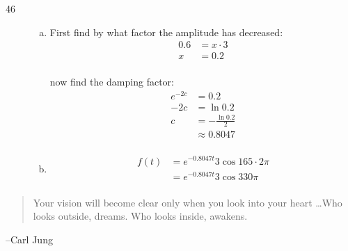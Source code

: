 \documentclass{exam}
\begin{document}
\begin{description}
      \item[46]
        \begin{enumerate}[(a)]
          \item 
            First find by what factor the amplitude has decreased:
            \begin{align*}
              0.6 & = x \cdot 3 \\
              x   & = 0.2 \\
            \end{align*}

            now find the damping factor:
            \begin{align*}
              e^{-2c} & = 0.2 \\
              -2c     & = \ln 0.2 \\
              c       & = - \frac{\ln 0.2}{2} \\
                      & \approx \boxed{ 0.8047 } \\
            \end{align*}

          \item 
            \begin{align*}
              f(t) & = e^{-0.8047t} 3 \cos 165 \cdot 2 \pi \\
                   & = \boxed{ e^{-0.8047t} 3 \cos 330 \pi } \\
            \end{align*}

        \end{enumerate}

    \end{description}

  \else
    \vspace{10 cm}
    \begin{quote}
      \begin{em}
        Your vision will become clear only when you look into your heart \dots Who looks outside, dreams. Who looks inside, awakens.
      \end{em}
    \end{quote}
    \hspace{1 cm} --Carl Jung
  \fi
\end{document}
